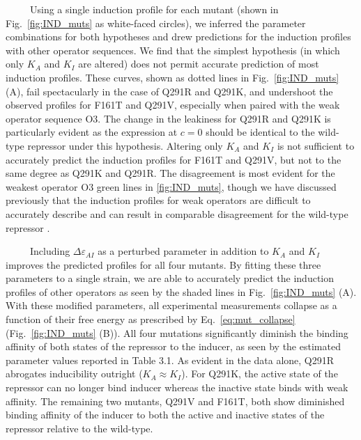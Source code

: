 \documentclass[12pt]{caltech_thesis}
\begin{document}
~~~~~Using a single induction profile for each mutant (shown in
Fig.~\ref{fig:IND_muts} as white-faced circles), we inferred the
parameter combinations for both hypotheses and drew predictions for the
induction profiles with other operator sequences. We find that the
simplest hypothesis (in which only \(K_A\) and \(K_I\) are altered) does
not permit accurate prediction of most induction profiles. These curves,
shown as dotted lines in Fig.~\ref{fig:IND_muts} (A), fail spectacularly
in the case of Q291R and Q291K, and undershoot the observed profiles for
F161T and Q291V, especially when paired with the weak operator sequence
O3. The change in the leakiness for Q291R and Q291K is particularly
evident as the expression at \(c = 0\) should be identical to the
wild-type repressor under this hypothesis. Altering only \(K_A\) and
\(K_I\) is not sufficient to accurately predict the induction profiles
for F161T and Q291V, but not to the same degree as Q291K and Q291R. The
disagreement is most evident for the weakest operator O3 green lines in
\ref{fig:IND_muts}, though we have discussed previously that the
induction profiles for weak operators are difficult to accurately
describe and can result in comparable disagreement for the wild-type
repressor \autocite{razo-mejia2018}.

~~~~~Including \(\Delta\varepsilon_{AI}\) as a perturbed parameter in
addition to \(K_A\) and \(K_I\) improves the predicted profiles for all
four mutants. By fitting these three parameters to a single strain, we
are able to accurately predict the induction profiles of other operators
as seen by the shaded lines in Fig.~\ref{fig:IND_muts} (A). With these
modified parameters, all experimental measurements collapse as a
function of their free energy as prescribed by Eq.~\ref{eq:mut_collapse}
(Fig.~\ref{fig:IND_muts} (B)). All four mutations significantly diminish
the binding affinity of both states of the repressor to the inducer, as
seen by the estimated parameter values reported in Table 3.1. As evident
in the data alone, Q291R abrogates inducibility outright
(\(K_A \approx K_I\)). For Q291K, the active state of the repressor can
no longer bind inducer whereas the inactive state binds with weak
affinity. The remaining two mutants, Q291V and F161T, both show
diminished binding affinity of the inducer to both the active and
inactive states of the repressor relative to the wild-type.
\end{document}
